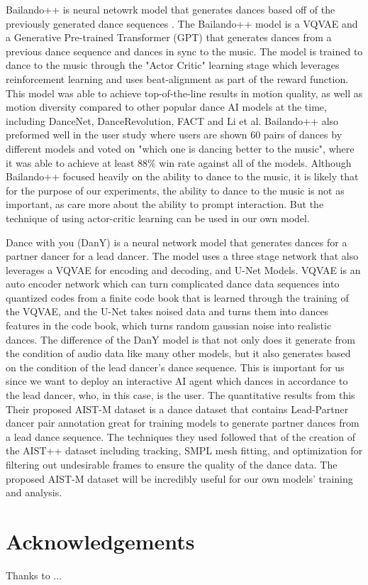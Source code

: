 \documentclass[final,5p,times,twocolumn,authoryear]{article}
\begin{document}
Bailando++ is neural netowrk model that generates dances based off of
the previously generated dance sequences \cite{Siyao2023}. The
Bailando++ model is a VQVAE and a Generative Pre-trained Transformer
(GPT) that generates dances from a previous dance sequence and dances in sync
to the music. The model is trained to dance to the music through
the "Actor Critic" learning stage which leverages
reinforcement learning and uses beat-alignment as part of the reward function. This
model was able to achieve top-of-the-line results in motion quality, as
well as motion diversity compared to other
popular dance AI models at the time, including DanceNet,
DanceRevolution, FACT and Li et al. Bailando++ also preformed well in
the user study where users are shown 60 pairs of dances by different
models and voted on "which one is dancing better to the music", where it
was able to achieve at least 88\% win rate against all of the models.
Although Bailando++ focused heavily on the ability to dance to the
music, it is likely that for the purpose of our experiments, the ability
to dance to the music is not as important, as care more about the
ability to prompt interaction. But the technique of using actor-critic
learning can be used in our own model.


Dance with you (DanY) \cite{Yao2023} is a neural network model that generates
dances for a partner dancer for a lead dancer. The model uses a three
stage network that also leverages a VQVAE for encoding and decoding, and
U-Net Models. VQVAE is an auto encoder network which can turn complicated dance data sequences into quantized
codes from a finite code book that is learned through the training of
the VQVAE, and the U-Net takes noised data and turns them into dances
features in the code book, which turns random gaussian noise into
realistic dances. The difference of the DanY model is that not only does
it generate from the condition of audio data like many other models, but
it also generates based on the condition of the lead dancer's dance
sequence. This is important for us since we want to deploy an
interactive AI agent which dances in accordance to the lead dancer, who,
in this case, is the user. The quantitative results from this 
Their proposed AIST-M dataset is a dance dataset that contains
Lead-Partner dancer pair annotation great for training models to
generate partner dances from a lead dance sequence. The techniques they used followed that of the creation of the
AIST++ dataset \cite{Li2021} including tracking, SMPL mesh fitting, and
optimization for filtering out undesirable frames to ensure the quality
of the dance data. The proposed AIST-M dataset will be incredibly useful
for our own models' training and analysis.

\section*{Acknowledgements}

Thanks to ...

 

\end{document}
